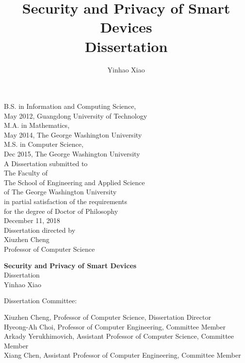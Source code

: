 \documentclass[letterpaper,12pt]{article}
\begin{document}
   \author{{\normalsize Yinhao Xiao}}
   \title{\Large{\bf Security and Privacy of Smart Devices} \\ \large Dissertation}
   \date{}
   \maketitle
   \thispagestyle{empty}
   \begin{center}
       B.S. in Information and Computing Science,\\ May 2012, Guangdong University of Technology \\
       M.A. in Mathematics,\\ May 2014, The George Washington University \\
       M.S. in Computer Science,\\ Dec 2015, The George Washington University \\[\baselineskip]
       
       A Dissertation submitted to\\
       The Faculty of\\The School of Engineering and Applied Science\\ of The George
       Washington University\\ in partial satisfaction of the requirements\\ for the degree
       of Doctor of Philosophy\\[\baselineskip]
       December 11, 2018\\[\baselineskip]
       Dissertation directed by\\[\baselineskip]
       Xiuzhen Cheng\\Professor of Computer Science
   \end{center}
   \pagestyle{plain}
   \setcounter{page}{1}


   \newpage
   \doublespacing
   \begin{center}
   {\Large{\bf Security and Privacy of Smart Devices}\\ \large Dissertation}\\[\baselineskip]
   {\normalsize Yinhao Xiao}
   \end{center}
   \noindent Dissertation Committee:\\

   \hfill\begin{minipage}{5in}
   {Xiuzhen Cheng, Professor of Computer Science, Dissertation
       Director}\\[\baselineskip]
  {Hyeong-Ah Choi, Professor of Computer Engineering, Committee Member}\\[\baselineskip]
  {Arkady Yerukhimovich, Assistant Professor of Computer Science, Committee Member}\\[\baselineskip]
   {Xiang Chen, Assistant Professor of Computer Engineering, Committee Member}\\[\baselineskip]

   
   
   \end{minipage}
\end{document}
